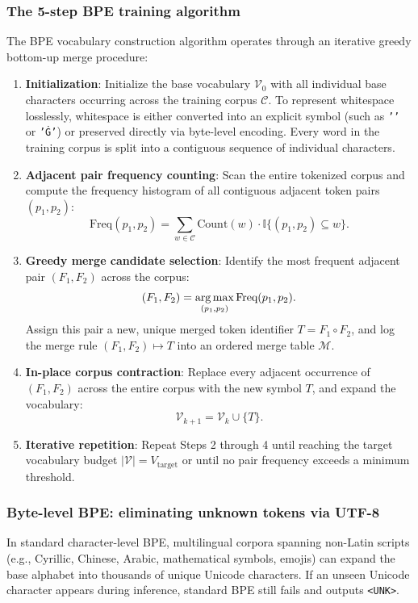 \documentclass[../../main.tex]{subfiles}
\begin{document}
\subsubsection{The 5-step BPE training algorithm}
The BPE vocabulary construction algorithm operates through an iterative greedy bottom-up merge procedure:
\begin{enumerate}
    \item \textbf{Initialization}: Initialize the base vocabulary $\mathcal{V}_0$ with all individual base characters occurring across the training corpus $\mathcal{C}$. To represent whitespace losslessly, whitespace is either converted into an explicit symbol (such as \texttt{'\textvisiblespace{}'} or \texttt{'Ġ'}) or preserved directly via byte-level encoding. Every word in the training corpus is split into a contiguous sequence of individual characters.
    \item \textbf{Adjacent pair frequency counting}: Scan the entire tokenized corpus and compute the frequency histogram of all contiguous adjacent token pairs $(p_1, p_2)$:
    \begin{equation}
    \label{eq:bpe_pair_counting}
    \text{Freq}(p_1, p_2) = \sum_{w \in \mathcal{C}} \text{Count}(w) \cdot \mathbb{I}\{(p_1, p_2) \subseteq w\}.
    \end{equation}
    \item \textbf{Greedy merge candidate selection}: Identify the most frequent adjacent pair $(F_1, F_2)$ across the corpus:
    \begin{equation}
    (F_1, F_2) = \operatorname*{\mathrm{arg\,max}}_{(p_1, p_2)} \text{Freq}(p_1, p_2).
    \end{equation}
    Assign this pair a new, unique merged token identifier $T = F_1 \circ F_2$, and log the merge rule $(F_1, F_2) \mapsto T$ into an ordered merge table $\mathcal{M}$.
    \item \textbf{In-place corpus contraction}: Replace every adjacent occurrence of $(F_1, F_2)$ across the entire corpus with the new symbol $T$, and expand the vocabulary:
    \begin{equation}
    \mathcal{V}_{k+1} = \mathcal{V}_k \cup \{T\}.
    \end{equation}
    \item \textbf{Iterative repetition}: Repeat Steps 2 through 4 until reaching the target vocabulary budget $|\mathcal{V}| = V_{\text{target}}$ or until no pair frequency exceeds a minimum threshold.
\end{enumerate}

\subsubsection{Byte-level BPE: eliminating unknown tokens via UTF-8}
In standard character-level BPE, multilingual corpora spanning non-Latin scripts (e.g., Cyrillic, Chinese, Arabic, mathematical symbols, emojis) can expand the base alphabet into thousands of unique Unicode characters. If an unseen Unicode character appears during inference, standard BPE still fails and outputs \texttt{<UNK>}.
\end{document}
